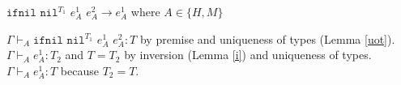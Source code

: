 \begin{case}
$\mathtt{ifnil}$ $\mathtt{nil}^{T_{1}}$ $e_{A}^{1}$ $e_{A}^{2}\rightarrow e_{A}^{1}$ where $A\in\lbrace H,M\rbrace$

$\Gamma\vdash_{A}\mathtt{ifnil}$ $\mathtt{nil}^{T_{1}}$ $e_{A}^{1}$ $e_{A}^{2}:T$ by premise and uniqueness of types (Lemma \ref{uot}).  $\Gamma\vdash_{A}e_{A}^{1}:T_{2}$ and $T=T_{2}$ by inversion (Lemma \ref{i}) and uniqueness of types.  $\Gamma\vdash_{A}e_{A}^{1}:T$ because $T_{2}=T$.
\end{case}
